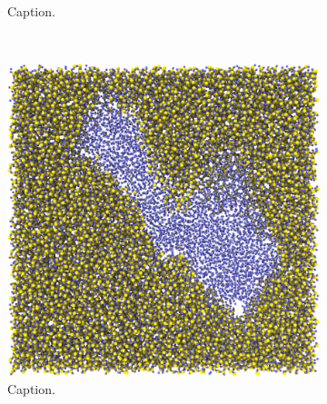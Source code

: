 \begin{figure}[htpb]
\begin{subfigure}[b]{\myfigwidth}
        \caption{Caption.}%
    \end{subfigure}%
    \\%
    \begin{subfigure}[b]{\myfigwidth}%
        \centering%
        \includegraphics[width=\textwidth]{images/systems/trimmed-rough_fracture03_07}%
        \caption{Caption.}%
    \end{subfigure}%
    \hfill%
    \begin{subfigure}[b]{\myfigwidth}%
        \centering%

\end{subfigure}
\end{figure}
